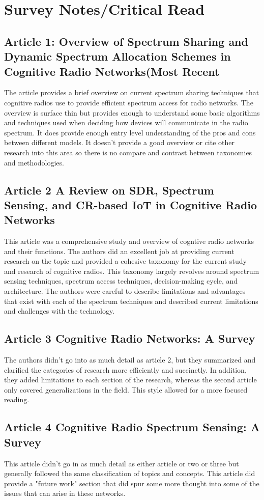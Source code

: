 \documentclass{article}
\title{Journal#3 - Survey Paper Research}
\author{James A Turner}
\date{September 2022}
\begin{document}
\newpage
\section{Survey Notes/Critical Read}
\subsection{Article 1: Overview of Spectrum Sharing and Dynamic Spectrum Allocation Schemes in Cognitive Radio Networks(Most Recent}\cite{1}
The article provides a brief overview on current spectrum sharing techniques that cognitive radios use to provide efficient spectrum access for radio networks.  The overview is surface thin but provides enough to understand some basic algorithms and techniques used when deciding how devices will communicate in the radio spectrum.  It does provide enough entry level understanding of the pros and cons between different models.  It doesn't provide a good overview or cite other research into this area so there is no compare and contrast between taxonomies and methodologies.
\subsection{Article 2 A Review on SDR, Spectrum Sensing, and CR-based IoT in Cognitive Radio Networks}\cite{2}
This article was a comprehensive study and overview of cogntive radio networks and their functions.  The authors did an excellent job at providing current research on the topic and provided a cohesive taxonomy for the current study and research of cognitive radios.  This taxonomy largely revolves around spectrum sensing techniques, spectrum access techniques, decision-making cycle, and architecture.  The authors were careful to describe limitations and advantages that exist with each of the spectrum techniques and described current limitations and challenges with the technology.
\subsection{Article 3 Cognitive Radio Networks: A Survey}\cite{3}
The authors didn't go into as much detail as article 2, but they summarized and clarified the categories of research more efficiently and succinctly.  In addition, they added limitations to each section of the research, whereas the second article only covered generalizations in the field.  This style allowed for a more focused reading.
\subsection{Article 4 Cognitive Radio Spectrum Sensing: A Survey}\cite{4}
This article didn't go in as much detail as either article or two or three but generally followed the same classification of topics and concepts.  This article did provide a "future work" section that did spur some more thought into some of the issues that can arise in these networks. 
\end{document}
